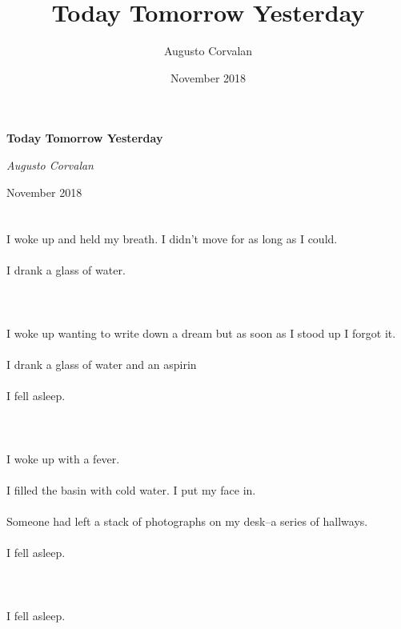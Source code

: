 \documentclass{article}
\title{Today Tomorrow Yesterday}
\date{November 2018}
\author{Augusto Corvalan}
\begin{document}
    \begin{titlepage}
    \centering

    \vspace{3cm}
    {\huge\bfseries Today Tomorrow Yesterday \par}
    \vspace{2cm}
    {\Large\itshape Augusto Corvalan\par}
    \vfill
    {\large November 2018\par}
    \end{titlepage}

    
    \section{}
    I woke up and held my breath. I didn't move for as long as I could.\\\\I drank a glass of water.\\\\ 
    \newpage
    
    \section{}
    I woke up wanting to write down a dream but as soon as I stood up I forgot it.\\\\I drank a glass of water and an aspirin\\\\I fell asleep.\\\\ 
    \newpage
    
    \section{}
    I woke up with a fever.\\\\I filled the basin with cold water. I put my face in.\\\\Someone had left a stack of photographs on my desk--a series of hallways.\\\\I fell asleep.\\\\ 
    \newpage
    
    \section{}
    I fell asleep.\\\\ 
    \newpage
    
\end{document}
